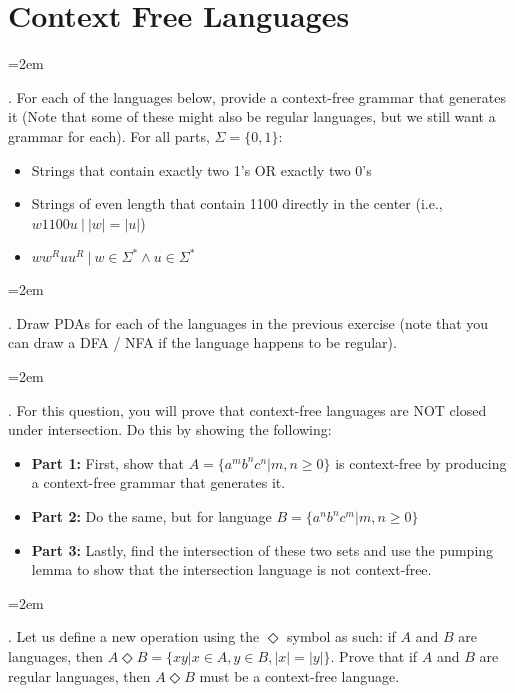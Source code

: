 \documentclass[12pt]{article}
\def\homework{Context Free Languages}
\newcounter{quesnum}
\newcommand{\question}[2][??]{
\begin{list}{\labelitemi}{\leftmargin=2em}
\item [\arabic{quesnum}.] {} {#2}
\end{list}
\addtocounter{quesnum}{1}
}
\begin{document}
\section*{\homework}


\question[3]{
For each of the languages below, provide a context-free grammar that generates it (Note that some of these might also be regular languages, but we still want a grammar for each). For all parts, $\Sigma=\{0,1\}$:
}

\begin{itemize}
	\item Strings that contain exactly two 1's OR exactly two 0's
	\item Strings of even length that contain 1100 directly in the center (i.e., $w1100u \ | \ |w|=|u|$)
	\item $ww^Ruu^R \ | \ w \in \Sigma^* \wedge u \in \Sigma^*$
\end{itemize}

\vspace{12pt}

\question[3]{
Draw PDAs for each of the languages in the previous exercise (note that you can draw a DFA / NFA if the language happens to be regular).
}

\vspace{12pt}

\question[3]{
For this question, you will prove that context-free languages are NOT closed under intersection. Do this by showing the following:
}

\begin{itemize}
	\item \textbf{Part 1:} First, show that $A=\{a^mb^nc^n | m,n \geq 0\}$ is context-free by producing a context-free grammar that generates it.
	\item \textbf{Part 2:} Do the same, but for language $B=\{a^nb^nc^m | m,n \geq 0\}$
	\item \textbf{Part 3:} Lastly, find the intersection of these two sets and use the pumping lemma to show that the intersection language is not context-free.
\end{itemize}

\vspace{12pt}



\question[3]{
Let us define a new operation using the $\Diamond$ symbol as such: if $A$ and $B$ are languages, then $A \Diamond B = \{xy | x \in A, y \in B, |x|=|y| \}$. Prove that if $A$ and $B$ are regular languages, then $A \Diamond B$ must be a context-free language.
}
\end{document}
